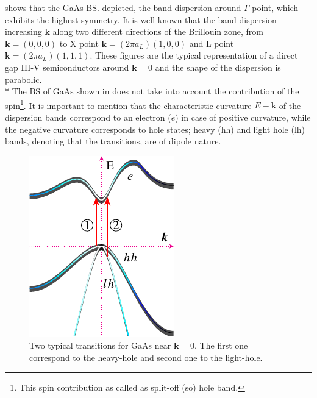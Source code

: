  shows that the GaAs \gls{BS}.  depicted, the band dispersion around $\Gamma$ point, which exhibits the highest symmetry.  It is well-known that the band dispersion increasing $\boldsymbol{k}$ along two different directions of the Brillouin zone, from $\boldsymbol{k}=(0,0,0)$ to X point $\boldsymbol{k}=(2\pi a_{L})(1,0,0)$ and L point $\boldsymbol{k}=(2\pi a_{L})(1,1,1)$. These figures are the typical representation of a direct gap III-V semiconductors around  $\boldsymbol{k}=0$ and the shape of the dispersion is parabolic.\\* The BS of GaAs shown in  does not take into account the contribution of the spin\footnote{This spin contribution as called as split-off (so) hole band.}.  It is important to mention that the characteristic curvature $E\!\!-\!\!\boldsymbol{k}$ of the dispersion bands correspond to an electron ($e$) in case of positive curvature, while the negative curvature corresponds to hole states; heavy (hh) and light hole (lh) bands, denoting that the transitions, are of dipole nature\cite{fox2002optical,cardona2005fundamentals}. 
\begin{figure}[h!]
	\centering
		\includegraphics[width=0.5\linewidth]{../figures/chapter-1/bands/build/bands02}
	\caption{Two typical transitions for GaAs near $\boldsymbol{k}=0$. The first one correspond to the heavy-hole and second one to the light-hole. }
	\label{fig:subsubsection-1.1.1-GaAsbands-2}
\end{figure}

